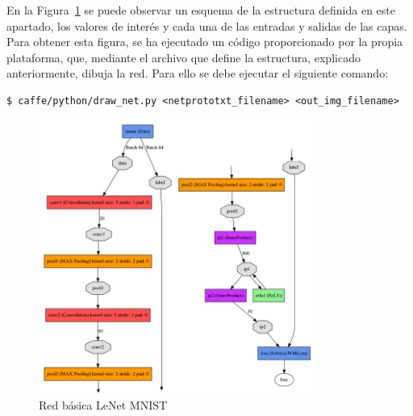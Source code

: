 	En la Figura~\ref{fig.redBasica} se puede observar un esquema de la estructura definida en este apartado, los valores de interés y cada una de las entradas y salidas de las capas. Para obtener esta figura, se ha ejecutado un código proporcionado por la propia plataforma, que, mediante el archivo que define la estructura, explicado anteriormente, dibuja la red. Para ello se debe ejecutar el siguiente comando:
	\vspace{10pt}
	\begin{lstlisting}[frame=single]
	$ caffe/python/draw_net.py <netprototxt_filename> <out_img_filename>
	\end{lstlisting}
	
	\begin{figure}[H]
		\begin{center}
			\includegraphics[width=0.8\textwidth]{figures/Original_net}
			\caption{Red básica LeNet MNIST}
			\label{fig.redBasica}
		\end{center}
	\end{figure}
	
